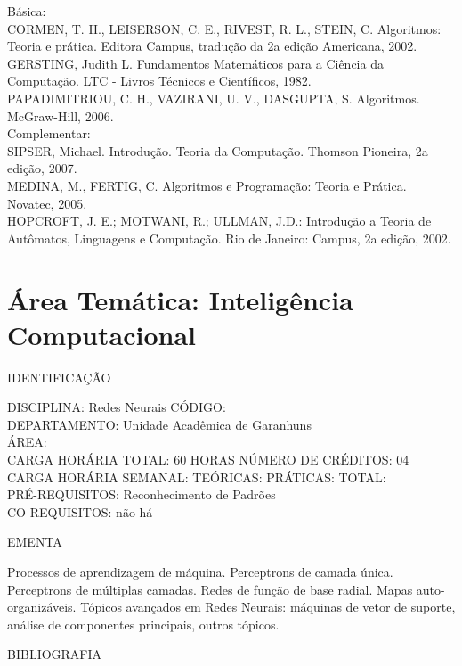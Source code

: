 \documentclass[
	12pt,				%
	openright,			%
  oneside,     %
	a4paper,			%
	english,			%
	french,				%
	spanish,			%
	brazil				%
	]{abntex2}
\begin{document}
\begin{apendicesenv}
Básica:\\
CORMEN, T. H., LEISERSON, C. E., RIVEST, R. L., STEIN, C. Algoritmos: Teoria e prática. Editora Campus, tradução da 2a edição Americana, 2002.\\
GERSTING, Judith L. Fundamentos Matemáticos para a Ciência da Computação. LTC - Livros Técnicos e Científicos, 1982.\\
PAPADIMITRIOU, C. H., VAZIRANI, U. V., DASGUPTA, S. Algoritmos. McGraw-Hill, 2006.\\
Complementar:\\
SIPSER, Michael. Introdução. Teoria da Computação. Thomson Pioneira, 2a edição, 2007.\\
MEDINA, M., FERTIG, C. Algoritmos e Programação: Teoria e Prática. Novatec, 2005.\\
HOPCROFT, J. E.; MOTWANI, R.; ULLMAN, J.D.: Introdução a Teoria de Autômatos, Linguagens e Computação. Rio de Janeiro: Campus, 2a edição, 2002.\\
\newpage 

\section*{Área Temática: Inteligência Computacional}

IDENTIFICAÇÃO

DISCIPLINA: Redes Neurais CÓDIGO:\\ 
DEPARTAMENTO: Unidade Acadêmica de Garanhuns\\
ÁREA: \\
CARGA HORÁRIA TOTAL: 60 HORAS NÚMERO DE CRÉDITOS: 04\\
CARGA HORÁRIA SEMANAL: TEÓRICAS: PRÁTICAS: TOTAL: \\
PRÉ-REQUISITOS: Reconhecimento de Padrões\\
CO-REQUISITOS: não há

EMENTA 

Processos de aprendizagem de máquina. Perceptrons de camada única.
Perceptrons de múltiplas camadas. Redes de função de base radial. Mapas
auto-organizáveis. Tópicos avançados em Redes Neurais: máquinas de
vetor de suporte, análise de componentes principais, outros tópicos.

BIBLIOGRAFIA 


\end{apendicesenv}
\end{document}

